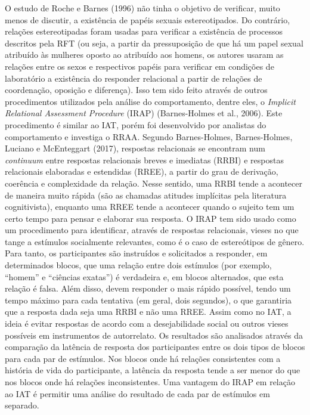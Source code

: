 O estudo de Roche e Barnes (1996) não tinha o objetivo de verificar, muito menos de discutir, a existência de papéis sexuais estereotipados. Do contrário, relações estereotipadas foram usadas para verificar a existência de processos descritos pela RFT (ou seja, a partir da pressuposição de que há um papel sexual atribuído às mulheres oposto ao atribuído aos homens, os autores usaram as relações entre os sexos e respectivos papéis para verificar em condições de laboratório a existência do responder relacional a partir de relações de coordenação, oposição e diferença). Isso tem sido feito através de outros procedimentos utilizados pela análise do comportamento, dentre eles, o \textit{Implicit Relational Assessment Procedure} (IRAP) (Barnes-Holmes et al., 2006). Este procedimento é similar ao IAT, porém foi desenvolvido por analistas do comportamento e investiga o RRAA. Segundo Barnes-Holmes, Barnes-Holmes, Luciano e McEnteggart (2017), respostas relacionais se encontram num \textit{continuum} entre respostas relacionais breves e imediatas (RRBI) e respostas relacionais elaboradas e estendidas (RREE), a partir do grau de derivação, coerência e complexidade da relação. Nesse sentido, uma RRBI tende a acontecer de maneira muito rápida (são as chamadas atitudes implícitas pela literatura cognitivista), enquanto uma RREE tende a acontecer quando o sujeito tem um certo tempo para pensar e elaborar sua resposta. O IRAP tem sido usado como um procedimento para identificar, através de respostas relacionais, vieses no que tange a estímulos socialmente relevantes, como é o caso de estereótipos de gênero. Para tanto, os participantes são instruídos e solicitados a responder, em determinados blocos, que uma relação entre dois estímulos (por exemplo, ``homem'' e ``ciências exatas'') é verdadeira e, em blocos alternados, que esta relação é falsa. Além disso, devem responder o mais rápido possível, tendo um tempo máximo para cada tentativa (em geral, dois segundos), o que garantiria que a resposta dada seja uma RRBI e não uma RREE. Assim como no IAT, a ideia é evitar respostas de acordo com a desejabilidade social ou outros vieses possíveis em instrumentos de autorrelato. Os resultados são analisados através da comparação da latência de resposta dos participantes entre os dois tipos de blocos para cada par de estímulos. Nos blocos onde há relações consistentes com a história de vida do participante, a latência da resposta tende a ser menor do que nos blocos onde há relações inconsistentes. Uma vantagem do IRAP em relação ao IAT é permitir uma análise do resultado de cada par de estímulos em separado.


